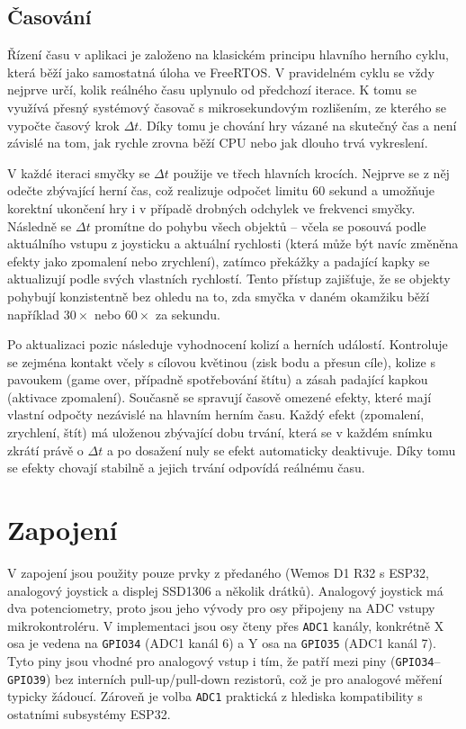 \documentclass[11pt,a4paper]{article}
\begin{document}
\subsection{Časování}

Řízení času v aplikaci je založeno na klasickém principu hlavního herního cyklu, která běží jako samostatná úloha ve FreeRTOS. V pravidelném cyklu se vždy nejprve určí, kolik reálného
času uplynulo od předchozí iterace. K tomu se využívá přesný systémový časovač s mikrosekundovým rozlišením, ze kterého se vypočte časový krok $\Delta t$. Díky tomu je chování hry
vázané na skutečný čas a není závislé na tom, jak rychle zrovna běží CPU nebo jak dlouho trvá vykreslení.

V každé iteraci smyčky se $\Delta t$ použije ve třech hlavních krocích. Nejprve se z něj odečte zbývající herní čas, což realizuje odpočet limitu 60 sekund a umožňuje korektní ukončení
hry i v případě drobných odchylek ve frekvenci smyčky. Následně se $\Delta t$ promítne do pohybu všech objektů -- včela se posouvá podle aktuálního vstupu z joysticku a aktuální rychlosti
(která může být navíc změněna efekty jako zpomalení nebo zrychlení), zatímco překážky a padající kapky se aktualizují podle svých vlastních rychlostí. Tento přístup zajišťuje, že se
objekty pohybují konzistentně bez ohledu na to, zda smyčka v daném okamžiku běží například $30\times$ nebo $60\times$ za sekundu.

Po aktualizaci pozic následuje vyhodnocení kolizí a herních událostí. Kontroluje se zejména kontakt včely s cílovou květinou (zisk bodu a přesun cíle), kolize s pavoukem (game over,
případně spotřebování štítu) a zásah padající kapkou (aktivace zpomalení). Současně se spravují časově omezené efekty, které mají vlastní odpočty nezávislé na hlavním herním času.
Každý efekt (zpomalení, zrychlení, štít) má uloženou zbývající dobu trvání, která se v každém snímku zkrátí právě o $\Delta t$ a po dosažení nuly se efekt automaticky deaktivuje. Díky
tomu se efekty chovají stabilně a jejich trvání odpovídá reálnému času.

\section{Zapojení}

V zapojení jsou použity pouze prvky z předaného  (Wemos D1 R32 s ESP32, analogový joystick a displej SSD1306 a několik drátků). Analogový joystick má dva potenciometry, proto jsou jeho vývody pro osy připojeny na ADC vstupy mikrokontroléru. V implementaci jsou osy čteny přes \texttt{ADC1} kanály, konkrétně X osa je vedena na \texttt{GPIO34} (ADC1 kanál 6) a Y osa na \texttt{GPIO35} (ADC1 kanál 7). Tyto piny jsou vhodné pro analogový vstup i tím, že patří mezi  piny (\texttt{GPIO34}–\texttt{GPIO39}) bez interních pull-up/pull-down rezistorů, což je pro analogové měření typicky žádoucí. Zároveň je volba \texttt{ADC1} praktická z hlediska kompatibility s ostatními subsystémy ESP32.
\end{document}
